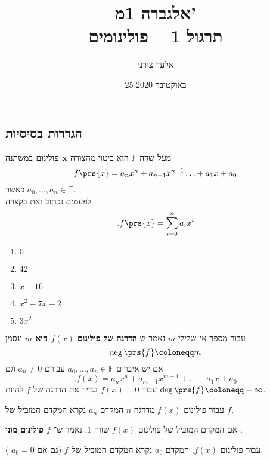 \documentclass[article, 10pt,oneside]{article}
\title{
אלגברה 1מ' \\ תרגול 1 -- פולינומים
}
\author{אלעד צורני}
\date{
25 באוקטובר 2020
}
\renewcommand{\emph}[1]{\textbf{#1}}
\begin{document}
\maketitle

\subsection*{הגדרות בסיסיות}

\begin{definition}[פולינום]
\emph{פולינום במשתנה x מעל שדה $\mathbb{F}$}
הוא ביטוי מהצורה
\[
f\prs{x} = a_n x^n + a_{n-1} x^{n-1} \ldots + a_1 x + a_0
\]
כאשר
$a_0, \ldots, a_n \in \mathbb{F}$.\\
לפעמים נכתוב זאת בקצרה
\[\text{.} f\prs{x} = \sum_{i = 0}^n a_i x^i\]
\end{definition}

\begin{examples*}[פולינומים]
\enumthm
\begin{enumerate}
\item $0$
\item $42$
\item $x-16$
\item $x^2 - 7x - 2$
\item $3 x^2$ 
\end{enumerate}
\end{examples*}

\begin{definition}
עבור מספר אי־שלילי
$m$
נאמר ש%
\emph{הדרגה של פולינום
$f(x)$
היא
$m$}
ונסמן
\[\deg \prs{f} \coloneqq m\]
אם יש איברים
$a_0, \ldots, a_n \in \mathbb{F}$
עבורם
$a_n \neq 0$
וגם
\[\text{.} f(x) = a_n x^n + a_{m-1} x^{m-1} + \ldots + a_1 x + a_0\]
עבור
$f(x) = 0$
נגדיר את הדרגה של
$f$
להיות
$\deg\prs{f} \coloneqq -\infty$.
\end{definition}

\begin{definition}
עבור פולינום
$f(x)$
מדרגה
$n$
המקדם
$a_n$
נקרא
\emph{המקדם המוביל של
$f$}.
\end{definition}

\begin{definition}[פולינום מוֹני]
אם המקדם המוביל של פולינום
$f(x)$
שווה
$1$,
נאמר ש־%
\emph{$f$
פולינום מוֹני%
}.
\end{definition}

\begin{definition}
עבור פולינום
$f(x)$,
המקדם
$a_0$
נקרא
\emph{המקדם המוביל של
$f$}
(גם אם
$a_0 = 0$%
).
\end{definition}
\end{document}
